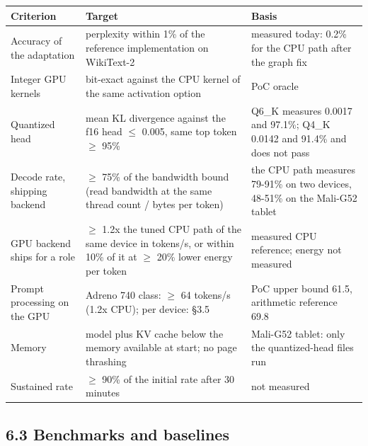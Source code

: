 \documentclass[
  10pt,
]{article}
\newcounter{none} %
\begin{document}
{\def\LTcaptype{none} %
\begin{longtable}[]{@{}
  >{\raggedright\arraybackslash}p{}
  >{\raggedright\arraybackslash}p{}
  >{\raggedright\arraybackslash}p{}@{}}
\toprule\noalign{}
\begin{minipage}[b]{\linewidth}\raggedright%
Criterion
\end{minipage} & \begin{minipage}[b]{\linewidth}\raggedright%
Target
\end{minipage} & \begin{minipage}[b]{\linewidth}\raggedright%
Basis
\end{minipage} \\
\midrule\noalign{}
\endhead%
\bottomrule\noalign{}
\endlastfoot%
Accuracy of the adaptation & perplexity within 1\% of the reference
implementation on WikiText-2 & measured today: 0.2\% for the CPU path
after the graph fix \\
Integer GPU kernels & bit-exact against the CPU kernel of the same
activation option & PoC oracle \\
Quantized head & mean KL divergence against the f16 head $\leq$ 0.005, same
top token $\geq$ 95\% & Q6\_K measures 0.0017 and 97.1\%; Q4\_K 0.0142 and
91.4\% and does not pass \\
Decode rate, shipping backend & $\geq$ 75\% of the bandwidth bound (read
bandwidth at the same thread count / bytes per token) & the CPU path
measures 79-91\% on two devices, 48-51\% on the Mali-G52 tablet \\
GPU backend ships for a role & $\geq$ 1.2x the tuned CPU path of the same
device in tokens/s, or within 10\% of it at $\geq$ 20\% lower energy per
token & measured CPU reference; energy not measured \\
Prompt processing on the GPU & Adreno 740 class: $\geq$ 64 tokens/s (1.2x
CPU); per device: \S{}3.5 & PoC upper bound 61.5, arithmetic reference 69.8 \\
Memory & model plus KV cache below the memory available at start; no
page thrashing & Mali-G52 tablet: only the quantized-head files run \\
Sustained rate & $\geq$ 90\% of the initial rate after 30 minutes & not measured \\
\end{longtable}
}

\subsection{6.3 Benchmarks and
baselines}\label{benchmarks-and-baselines}
\end{document}
